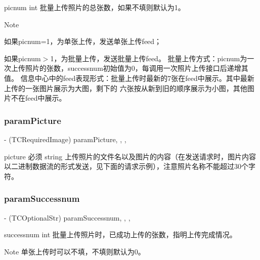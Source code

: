 picnum int 批量上传照片的总张数，如果不填则默认为1。 \begin{DoxyNote}{Note}

\begin{DoxyItemize}
\item 如果picnum=1，为单张上传，发送单张上传feed；
\item 如果picnum$>$1，为批量上传，发送批量上传feed。 批量上传方式：picnum为一次上传照片的张数，successnum初始值为0，每调用一次照片上传接口后递增其值。 信息中心中的feed表现形式：批量上传时最新的7张在feed中展示。其中最新上传的一张图片展示为大图，剩下的 六张按从新到旧的顺序展示为小图，其他图片不在feed中展示。 
\end{DoxyItemize}
\end{DoxyNote}
\mbox{\label{interface_t_c_upload_pic_dic_a3b2ede9d1defb0c1c3a97c8f6c4ebec4}} 
\subsubsection{\texorpdfstring{param\+Picture}{paramPicture}}
{\footnotesize\ttfamily -\/ (T\+C\+Required\+Image) param\+Picture\hspace{0.3cm}{\ttfamily [read]}, {\ttfamily [write]}, {\ttfamily [nonatomic]}, {\ttfamily [retain]}}

picture 必须 string 上传照片的文件名以及图片的内容（在发送请求时，图片内容以二进制数据流的形式发送，见下面的请求示例），注意照片名称不能超过30个字符。 \mbox{\label{interface_t_c_upload_pic_dic_a4ba2265303e8e044e3a5068c55cd124e}} 
\subsubsection{\texorpdfstring{param\+Successnum}{paramSuccessnum}}
{\footnotesize\ttfamily -\/ (T\+C\+Optional\+Str) param\+Successnum\hspace{0.3cm}{\ttfamily [read]}, {\ttfamily [write]}, {\ttfamily [nonatomic]}, {\ttfamily [assign]}}

successnum int 批量上传照片时，已成功上传的张数，指明上传完成情况。 \begin{DoxyNote}{Note}
单张上传时可以不填，不填则默认为0。 
\end{DoxyNote}
\mbox{\label{interface_t_c_upload_pic_dic_a0bd4a218e8c37174cf031c85ee8cd664}} 
